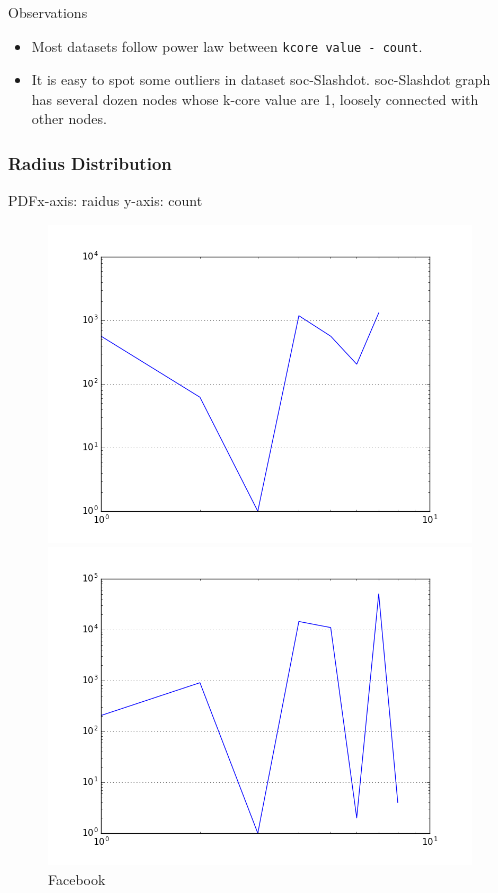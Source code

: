 Observations
\begin{itemize}
\item Most datasets follow power law between \texttt{kcore value - count}.
\item It is easy to spot some outliers in dataset soc-Slashdot. soc-Slashdot graph has several dozen nodes whose k-core value are 1, loosely connected with other nodes.
\end{itemize}

\subsubsection{Radius Distribution}

PDF\quad x-axis: raidus \quad y-axis: count

\begin{figure}[H]
  \includegraphics[width=\linewidth]{img/facebook/radius_dist.png}
  \caption*{Facebook}
\endminipage\hfill
{}
  \includegraphics[width=\linewidth]{img/slashDot/radius_dist.png}

\end{figure}
